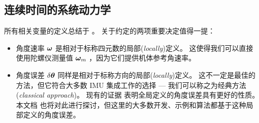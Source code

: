
\subsection{连续时间的系统动力学}

所有相关变量的定义总结于 。
关于约定的两项重要决定值得一提：
\begin{itemize}
\item
角度速率 ${\bm \omega}$ 是相对于标称四元数的局部(\emph{locally})定义。 
这使得我们可以直接使用陀螺仪测量值 ${\bm \omega}_m$ ，因为它们提供机体参考角速率。
\item
角度误差 $\delta{\bm \theta}$ 同样是相对于标称方向的局部(\emph{locally})定义。 
这不一定是最佳的方法，但它符合大多数 IMU 集成工作的选择 --- 我们可以称之为经典方法(\emph{classical approach})。 
现有的证据 \citep{LI-2012} 表明全局定义的角度误差具有更好的性质。 
本文档 也将对此进行探讨，但这里的大多数开发、示例和算法都基于这种局部定义的角度误差。
\end{itemize}

